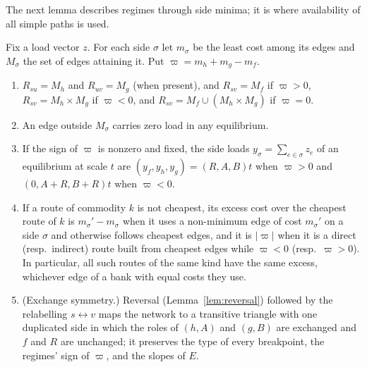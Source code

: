 The next lemma describes regimes through side minima; it is where
availability of all simple paths is used.

\begin{lemma}\label{lem:sides}
Fix a load vector $z$. For each side $\sigma$ let $m_\sigma$ be the least
cost among its edges and $M_\sigma$ the set of edges attaining it. Put
$\varpi=m_h+m_g-m_f$.
\begin{enumerate}
\item[(a)] $R_{su}=M_h$ and $R_{uv}=M_g$ (when present), and
 $R_{sv}=M_f$ if $\varpi>0$, $R_{sv}=M_h\times M_g$ if $\varpi<0$, and
 $R_{sv}=M_f\cup(M_h\times M_g)$ if $\varpi=0$.
\item[(b)] An edge outside $M_\sigma$ carries zero load in any equilibrium.
\item[(c)] If the sign of $\varpi$ is nonzero and fixed, the side loads
 $y_\sigma=\sum_{e\in\sigma}z_e$ of an equilibrium at scale $t$ are
 $(y_f,y_h,y_g)=(R,A,B)t$ when $\varpi>0$ and $(0,A+R,B+R)t$ when $\varpi<0$.
\item[(d)] If a route of commodity $k$ is not cheapest, its excess cost over
 the cheapest route of $k$ is $m_\sigma'-m_\sigma$ when it uses a
 non-minimum edge of cost $m_\sigma'$ on a side $\sigma$ and otherwise
 follows cheapest edges, and it is $|\varpi|$ when it is a direct (resp.\
 indirect) route built from cheapest edges while $\varpi<0$ (resp.\
 $\varpi>0$). In particular, all such routes of the same kind have the same
 excess, whichever edge of a bank with equal costs they use.
\item[(e)] (Exchange symmetry.) Reversal (Lemma~\ref{lem:reversal}) followed
 by the relabelling $s\leftrightarrow v$ maps the network to a transitive
 triangle with one duplicated side in which the roles of $(h,A)$ and $(g,B)$
 are exchanged and $f$ and $R$ are unchanged; it preserves the type of
 every breakpoint, the regimes' sign of $\varpi$, and the slopes of $E$.
\end{enumerate}
\end{lemma}

